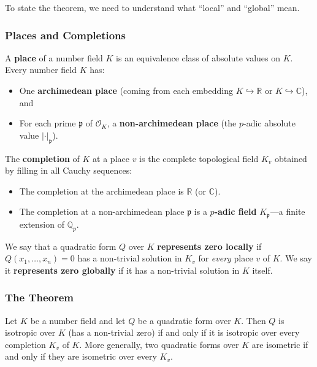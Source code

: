 To state the theorem, we need to understand what ``local'' and ``global'' mean.

\subsubsection{Places and Completions}

A \textbf{place} of a number field $K$ is an equivalence class of absolute values on $K$. Every number field $K$ has:
\begin{itemize}
    \item One \textbf{archimedean place} (coming from each embedding $K \hookrightarrow \mathbb{R}$ or $K \hookrightarrow \mathbb{C}$), and
    \item For each prime $\mathfrak{p}$ of $\mathcal{O}_K$, a \textbf{non-archimedean place} (the $p$-adic absolute value $|\cdot|_\mathfrak{p}$).
\end{itemize}

The \textbf{completion} of $K$ at a place $v$ is the complete topological field $K_v$ obtained by filling in all Cauchy sequences:
\begin{itemize}
    \item The completion at the archimedean place is $\mathbb{R}$ (or $\mathbb{C}$).
    \item The completion at a non-archimedean place $\mathfrak{p}$ is a \textbf{$p$-adic field} $K_\mathfrak{p}$---a finite extension of $\mathbb{Q}_p$.
\end{itemize}

We say that a quadratic form $Q$ over $K$ \textbf{represents zero locally} if $Q(x_1, \ldots, x_n) = 0$ has a non-trivial solution in $K_v$ for \emph{every} place $v$ of $K$. We say it \textbf{represents zero globally} if it has a non-trivial solution in $K$ itself.

\subsubsection{The Theorem}

\begin{theorem}
\label{thm:hasse-minkowski}
Let $K$ be a number field and let $Q$ be a quadratic form over $K$. Then $Q$ is isotropic over $K$ (has a non-trivial zero) if and only if it is isotropic over every completion $K_v$ of $K$. More generally, two quadratic forms over $K$ are isometric if and only if they are isometric over every $K_v$.
\end{theorem}

